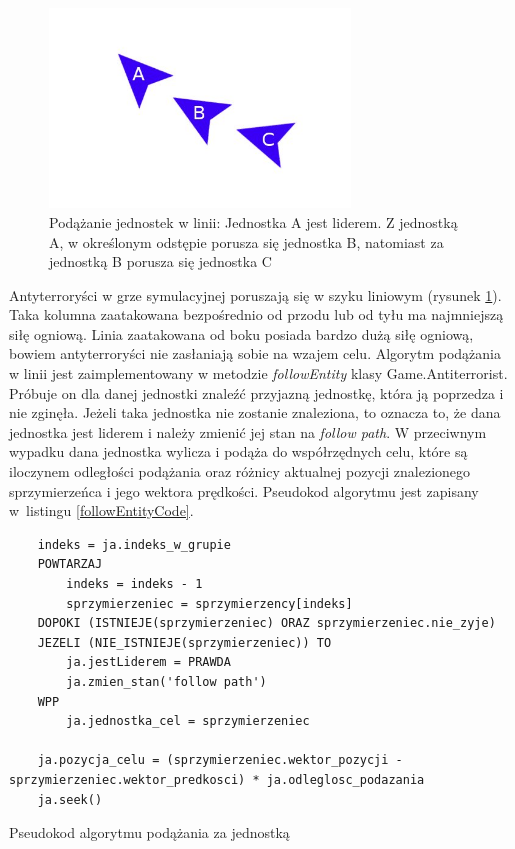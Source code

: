 \begin{figure}
\begin{center}
	\includegraphics[width=80mm,height=53mm]{images/followEntity}
	\caption[Podążanie jednostek w linii]{Podążanie jednostek w linii: Jednostka A jest liderem. Z jednostką A, w określonym odstępie porusza się jednostka B, natomiast za jednostką B porusza się jednostka C\label{followEntityImage}}
\end{center}
\end{figure}

Antyterroryści w grze symulacyjnej poruszają się w szyku liniowym (rysunek \ref{followEntityImage}). Taka kolumna zaatakowana bezpośrednio od przodu lub od tyłu ma najmniejszą siłę ogniową. Linia zaatakowana od boku posiada bardzo dużą siłę ogniową, bowiem antyterroryści nie zasłaniają sobie na wzajem celu. Algorytm podążania w linii jest zaimplementowany w metodzie \emph{followEntity} klasy Game.Antiterrorist. Próbuje on dla danej jednostki znaleźć przyjazną jednostkę, która ją poprzedza i nie zginęła. Jeżeli taka jednostka nie zostanie znaleziona, to oznacza to, że dana jednostka jest liderem i należy zmienić jej stan na \emph{follow path}. W przeciwnym wypadku dana jednostka wylicza i podąża do współrzędnych celu, które są iloczynem odległości podążania oraz różnicy aktualnej pozycji znalezionego sprzymierzeńca i jego wektora prędkości. Pseudokod algorytmu jest zapisany w~listingu \ref{followEntityCode}.

\begin{table}
\begin{center}
\begin{lstlisting}
	indeks = ja.indeks_w_grupie
	POWTARZAJ
		indeks = indeks - 1
		sprzymierzeniec = sprzymierzency[indeks]
	DOPOKI (ISTNIEJE(sprzymierzeniec) ORAZ sprzymierzeniec.nie_zyje)
	JEZELI (NIE_ISTNIEJE(sprzymierzeniec)) TO
		ja.jestLiderem = PRAWDA
		ja.zmien_stan('follow path')
	WPP
		ja.jednostka_cel = sprzymierzeniec

	ja.pozycja_celu = (sprzymierzeniec.wektor_pozycji - sprzymierzeniec.wektor_predkosci) * ja.odleglosc_podazania
	ja.seek()
\end{lstlisting}
\caption {Pseudokod algorytmu podążania za jednostką}
\label{followEntityCode}
\end{center}
\end{table}

